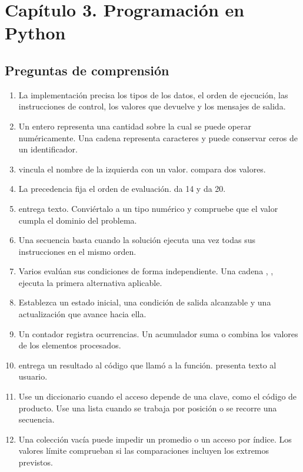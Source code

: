 \section{Capítulo 3. Programación en Python}

\subsection{Preguntas de comprensión}

\begin{enumerate}
\item La implementación precisa los tipos de los datos, el orden de ejecución, las instrucciones de control, los valores que devuelve y los mensajes de salida.
\item Un entero representa una cantidad sobre la cual se puede operar numéricamente. Una cadena representa caracteres y puede conservar ceros de un identificador.
\item \Codigo{=} vincula el nombre de la izquierda con un valor. \Codigo{==} compara dos valores.
\item La precedencia fija el orden de evaluación.  da 14 y  da 20.
\item {} entrega texto. Conviértalo a un tipo numérico y compruebe que el valor cumpla el dominio del problema.
\item Una secuencia basta cuando la solución ejecuta una vez todas sus instrucciones en el mismo orden.
\item Varios  evalúan sus condiciones de forma independiente. Una cadena , ,  ejecuta la primera alternativa aplicable.
\item Establezca un estado inicial, una condición de salida alcanzable y una actualización que avance hacia ella.
\item Un contador registra ocurrencias. Un acumulador suma o combina los valores de los elementos procesados.
\item {} entrega un resultado al código que llamó a la función.  presenta texto al usuario.
\item Use un diccionario cuando el acceso depende de una clave, como el código de producto. Use una lista cuando se trabaja por posición o se recorre una secuencia.
\item Una colección vacía puede impedir un promedio o un acceso por índice. Los valores límite comprueban si las comparaciones incluyen los extremos previstos.
\end{enumerate}

